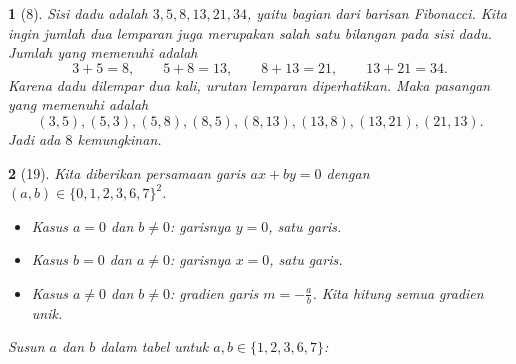 \documentclass[11pt,a4paper,DIV=12]{scrartcl}
\theoremstyle{problemstyle}
\theoremstyle{answerstyle}
\newtheorem{answer}{}
\begin{document}
\begin{answer}[8]
  Sisi dadu adalah $3,5,8,13,21,34$, yaitu bagian dari barisan Fibonacci. Kita ingin jumlah dua lemparan juga merupakan salah satu bilangan pada sisi dadu.
  Jumlah yang memenuhi adalah
  \[
    3+5=8,\qquad 5+8=13,\qquad 8+13=21,\qquad 13+21=34.
  \]
  Karena dadu dilempar dua kali, urutan lemparan diperhatikan. Maka pasangan yang memenuhi adalah
  \[
    (3,5),(5,3),(5,8),(8,5),(8,13),(13,8),(13,21),(21,13).
  \]
  Jadi ada $\boxed{8}$ kemungkinan.
\end{answer}

\begin{answer}[19]
  Kita diberikan persamaan garis $ax+by=0$ dengan $(a,b)\in\{0,1,2,3,6,7\}^2$.

  \begin{itemize}
    \item Kasus $a=0$ dan $b\neq 0$: garisnya $y=0$, satu garis.
    \item Kasus $b=0$ dan $a\neq 0$: garisnya $x=0$, satu garis.
    \item Kasus $a\neq 0$ dan $b\neq 0$: gradien garis $m=-\frac{a}{b}$. Kita hitung semua gradien unik.
  \end{itemize}

  Susun $a$ dan $b$ dalam tabel untuk $a,b\in\{1,2,3,6,7\}$:


\end{answer}
\end{document}
